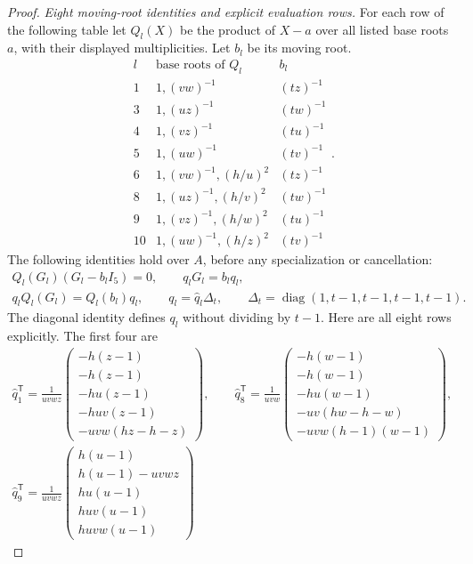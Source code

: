 \begin{proof}
\emph{Eight moving-root identities and explicit evaluation rows.}
For each row of the following table
let $Q_l(X)$ be the product of $X-a$
over all listed base roots $a$, with
their displayed multiplicities.
Let $b_l$ be its moving root.
\[
\begin{array}{c|c|c}
 l&\text{base roots of }Q_l&b_l\\\hline
 1&1,(vw)^{-1}&(tz)^{-1}\\
 3&1,(uz)^{-1}&(tw)^{-1}\\
 4&1,(vz)^{-1}&(tu)^{-1}\\
 5&1,(uw)^{-1}&(tv)^{-1}\\
 6&1,(vw)^{-1},(h/u)^2&(tz)^{-1}\\
 8&1,(uz)^{-1},(h/v)^2&(tw)^{-1}\\
 9&1,(vz)^{-1},(h/w)^2&(tu)^{-1}\\
 10&1,(uw)^{-1},(h/z)^2&(tv)^{-1}
\end{array}.
                                                               \tag{F.32.13}
\]
The following identities hold over $A$,
before any specialization or cancellation:
\[
 \begin{gathered}
 Q_l(G_l)(G_l-b_lI_5)=0,\qquad
 q_lG_l=b_lq_l,\\
 q_lQ_l(G_l)=Q_l(b_l)q_l,\qquad
 q_l=\widehat q_l\Delta_t,\qquad
               \Delta_t=\operatorname{diag}(1,t-1,t-1,t-1,t-1).
 \end{gathered}                                                \tag{F.32.14}
\]
The diagonal identity defines $q_l$
without dividing by $t-1$.
Here are all eight rows explicitly.
The first four are
\[
 \begin{gathered}
 \widehat q_1^{\mathsf T}=\frac1{uv wz}
 \begin{pmatrix}
 -h(z-1)\\-h(z-1)\\-hu(z-1)\\-huv(z-1)\\-uv w(hz-h-z)
 \end{pmatrix},\qquad
 \widehat q_8^{\mathsf T}=\frac1{uv w}
 \begin{pmatrix}
 -h(w-1)\\-h(w-1)\\-hu(w-1)\\-uv(hw-h-w)\\-uv w(h-1)(w-1)
 \end{pmatrix},\\
 \widehat q_9^{\mathsf T}=\frac1{uv wz}
 \begin{pmatrix}
 h(u-1)\\h(u-1)-uv wz\\hu(u-1)\\huv(u-1)\\huv w(u-1)

\end{pmatrix}
\end{gathered}\]
\end{proof}
